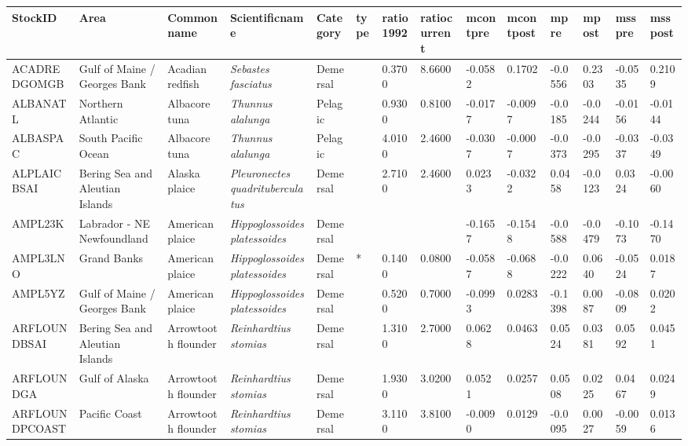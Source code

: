 \begin{longtable}{p{2.6cm}p{1.9cm}p{1.7cm}p{1.6cm}p{1cm}p{0.3cm}p{1cm}p{1cm}p{1cm}p{1.1cm}p{1cm}p{1.1cm}p{1cm}p{1.1cm}}
  \hline
StockID & Area & Commonname & Scientificname & Category & type & ratio1992 & ratiocurrent & mcontpre & mcontpost & mpre & mpost & msspre & msspost \\ 
  \hline
ACADREDGOMGB & Gulf of Maine / Georges Bank & Acadian redfish & \textit{Sebastes fasciatus} & Demersal &   & 0.3700 & 8.6600 & -0.0582 & 0.1702 & -0.0556 & 0.2303 & -0.0535 & 0.2109 \\ 
  ALBANATL & Northern Atlantic & Albacore tuna & \textit{Thunnus alalunga} & Pelagic &   & 0.9300 & 0.8100 & -0.0177 & -0.0097 & -0.0185 & -0.0244 & -0.0156 & -0.0144 \\ 
  ALBASPAC & South Pacific Ocean & Albacore tuna & \textit{Thunnus alalunga} & Pelagic &   & 4.0100 & 2.4600 & -0.0307 & -0.0007 & -0.0373 & -0.0295 & -0.0337 & -0.0349 \\ 
  ALPLAICBSAI & Bering Sea and Aleutian Islands & Alaska plaice & \textit{Pleuronectes quadrituberculatus} & Demersal &   & 2.7100 & 2.4600 & 0.0233 & -0.0322 & 0.0458 & -0.0123 & 0.0324 & -0.0060 \\ 
  AMPL23K & Labrador - NE Newfoundland & American plaice & \textit{Hippoglossoides platessoides} & Demersal &  &  &  & -0.1657 & -0.1548 & -0.0588 & -0.0479 & -0.1073 & -0.1470 \\ 
  AMPL3LNO & Grand Banks & American plaice & \textit{Hippoglossoides platessoides} & Demersal & * & 0.1400 & 0.0800 & -0.0587 & -0.0688 & -0.0222 & 0.0640 & -0.0524 & 0.0187 \\ 
  AMPL5YZ & Gulf of Maine / Georges Bank & American plaice & \textit{Hippoglossoides platessoides} & Demersal &   & 0.5200 & 0.7000 & -0.0993 & 0.0283 & -0.1398 & 0.0087 & -0.0809 & 0.0202 \\ 
  ARFLOUNDBSAI & Bering Sea and Aleutian Islands & Arrowtooth flounder & \textit{Reinhardtius stomias} & Demersal &   & 1.3100 & 2.7000 & 0.0628 & 0.0463 & 0.0524 & 0.0381 & 0.0592 & 0.0451 \\ 
  ARFLOUNDGA & Gulf of Alaska & Arrowtooth flounder & \textit{Reinhardtius stomias} & Demersal &   & 1.9300 & 3.0200 & 0.0521 & 0.0257 & 0.0508 & 0.0225 & 0.0467 & 0.0249 \\ 
  ARFLOUNDPCOAST & Pacific Coast & Arrowtooth flounder & \textit{Reinhardtius stomias} & Demersal &   & 3.1100 & 3.8100 & -0.0090 & 0.0129 & -0.0095 & 0.0027 & -0.0059 & 0.0136 \\ 

\end{longtable}
